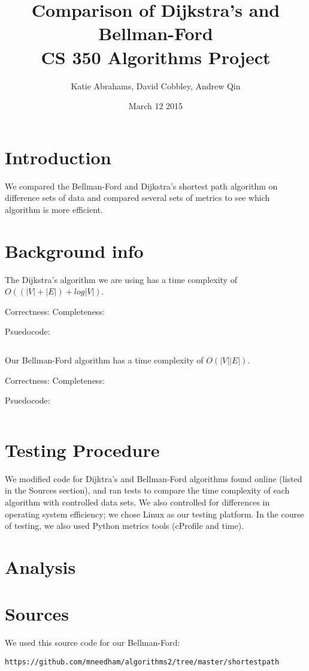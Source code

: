 \documentclass{article}
\title{Comparison of Dijkstra's and Bellman-Ford \\ CS 350 Algorithms Project}
\author{Katie Abrahams, David Cobbley, Andrew Qin}
\date{March 12 2015}
\begin{document}
\maketitle

\section{Introduction}

We compared the Bellman-Ford and Dijkstra's shortest path algorithm on difference sets of data and compared several sets of metrics to see which algorithm is more efficient.

\section{Background info}
The Dijkstra's algorithm we are using has a time complexity of $O((|V|+|E|)+log|V|)$.

Correctness:
Completeness:

Psuedocode:
\begin{verbatim}

\end{verbatim}

Our Bellman-Ford algorithm has a time complexity of $O(|V||E|)$.

Correctness:
Completeness:

Psuedocode:
\begin{verbatim}

\end{verbatim}
\section{Testing Procedure}
We modified code for Dijktra's and Bellman-Ford algorithms found online (listed in the Sources section), and ran tests to compare the time complexity of each algorithm with controlled data sets.  We also controlled for differences in operating system efficiency; we chose Linux as our testing platform.  In the course of testing, we also used Python metrics tools (cProfile and time).
\section{Analysis}

\section{Sources}

We used this source code for our Bellman-Ford:
\begin{verbatim}
https://github.com/mneedham/algorithms2/tree/master/shortestpath
\end{verbatim}
\end{document}
